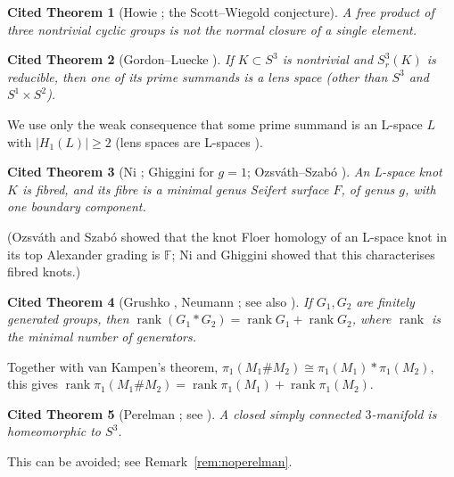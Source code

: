 \documentclass[11pt]{article}
\newtheorem{citedthm}{Cited Theorem}
\theoremstyle{definition}
\newcommand{\F}{\mathbb{F}}
\newcommand{\rk}{\operatorname{rank}}
\begin{document}
\begin{citedthm}[Howie \cite{Howie}; the Scott--Wiegold conjecture]\label{thm:howie}
A free product of three nontrivial cyclic groups is not the normal closure of a single element.
\end{citedthm}

\begin{citedthm}[Gordon--Luecke \cite{GL96}]\label{thm:GL96}
If $K\subset S^3$ is nontrivial and $S^3_r(K)$ is reducible, then one of its prime summands is a lens space (other than $S^3$ and $S^1\times S^2$).
\end{citedthm}

We use only the weak consequence that some prime summand is an L-space $L$ with $|H_1(L)|\ge 2$ (lens spaces are L-spaces \cite{OSlens}).

\begin{citedthm}[Ni \cite{Ni}; Ghiggini \cite{Ghiggini} for $g=1$; Ozsv\'ath--Szab\'o \cite{OSlens}]\label{thm:fibred}
An L-space knot $K$ is fibred, and its fibre is a minimal genus Seifert surface $F$, of genus $g$, with one boundary component.
\end{citedthm}


(Ozsv\'ath and Szab\'o \cite{OSlens} showed that the knot Floer homology of an L-space knot in its top Alexander grading is $\F$; Ni and Ghiggini showed that this characterises fibred knots.)

\begin{citedthm}[Grushko \cite{Grushko}, Neumann \cite{Neumann}; see also \cite{LS}]\label{thm:grushko}
If $G_1,G_2$ are finitely generated groups, then $\rk(G_1*G_2)=\rk G_1+\rk G_2$, where $\rk$ is the minimal number of generators.
\end{citedthm}
Together with van Kampen's theorem, $\pi_1(M_1\# M_2)\cong\pi_1(M_1)*\pi_1(M_2)$, this gives $\rk\pi_1(M_1\#M_2)=\rk\pi_1(M_1)+\rk\pi_1(M_2)$.

\begin{citedthm}[Perelman \cite{Perelman1,Perelman2,Perelman3}; see \cite{MorganTian}]\label{thm:perelman}
A closed simply connected $3$-manifold is homeomorphic to $S^3$.
\end{citedthm}
This can be avoided; see Remark~\ref{rem:noperelman}.
\end{document}
